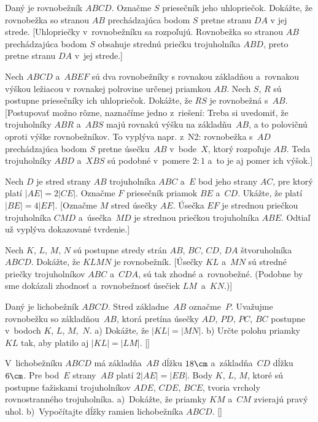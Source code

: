 {Daný je rovnobežník $ABCD$. Označme $S$ priesečník jeho uhlopriečok.
Dokážte, že rovnobežka so stranou $AB$ prechádzajúca bodom $S$ pretne stranu $DA$ v jej strede.
[Uhlopriečky v~rovnobežníku sa rozpoľujú.
Rovnobežka so stranou $AB$ prechádzajúca bodom $S$ obsahuje strednú priečku trojuholníka $ABD$, preto pretne stranu $DA$ v~jej strede.]

Nech $ABCD$ a~$ABEF$ sú dva rovnobežníky s rovnakou základňou a~rovnakou výškou ležiacou v rovnakej polrovine určenej priamkou $AB$. Nech $S$, $R$ sú postupne priesečníky ich uhlopriečok. Dokážte, že $RS$ je rovnobežná s~$AB$.
[Postupovať možno rôzne, naznačíme jedno z~riešení:
Treba si uvedomiť, že trojuholníky $ABR$ a~$ABS$ majú rovnakú výšku na základňu~$AB$, a to polovičnú oproti výške rovnobežníkov. To vyplýva napr. z~N2: rovnobežka s~$AD$ prechádzajúca bodom $S$ pretne úsečku~$AB$ v~bode~$X$, ktorý rozpoľuje $AB$. Teda trojuholníky $ABD$ a~$XBS$ sú podobné v~pomere $2:1$ a~to je aj pomer ich výšok.]

Nech $D$ je stred strany $AB$ trojuholníka $ABC$ a~$E$ bod
jeho strany $AC$, pre ktorý platí $|AE|=2|CE|$. Označme $F$ priesečník
 priamok $BE$ a~$CD$. Ukážte, že platí $|BE|=4|EF|$.
[Označme $M$ stred úsečky $AE$. Úsečka $EF$ je strednou priečkou
trojuholníka $CMD$ a~úsečka~$MD$ je strednou priečkou
trojuholníka $ABE$. Odtiaľ už vyplýva dokazované tvrdenie.]

\D
Nech $K$, $L$, $M$, $N$ sú postupne stredy strán $AB$,
$BC$, $CD$, $DA$ štvoruholníka $ABCD$.
Dokážte, že $KLMN$ je
rovnobežník.
[Úsečky
$KL$ a~$MN$ sú stredné priečky trojuholníkov $ABC$
a~$CDA$, sú tak zhodné a~rovnobežné. (Podobne by sme dokázali zhodnosť a~rovnobežnosť úsečiek $LM$~a~$KN$.)]

Daný je lichobežník $ABCD$. Stred základne~$AB$ označme~$P$.
Uvažujme rovnobežku so základňou~$AB$, ktorá pretína úsečky $AD$, $PD$, $PC$, $BC$ postupne
v~bodoch $K$, $L$, $M$,~$N$.
a) Dokážte, že $|KL| =|MN|$.
b) Určte polohu priamky~$KL$ tak, aby platilo aj $|KL|=|LM|$.
[]

V~lichobežníku $ABCD$ má základňa~$AB$ dĺžku $18\cm$ a~základňa~$CD$ dĺžku~$6\cm$. Pre bod~$E$ strany~$AB$ platí $2|AE|=|EB|$. Body $K$, $L$, $M$, ktoré sú postupne ťažiskami trojuholníkov $ADE$, $CDE$, $BCE$, tvoria vrcholy rovnostranného trojuholníka.
a)~Dokážte, že priamky $KM$ a~$CM$ zvierajú pravý uhol.
b)~Vypočítajte dĺžky ramien lichobežníka $ABCD$.
[]


}

